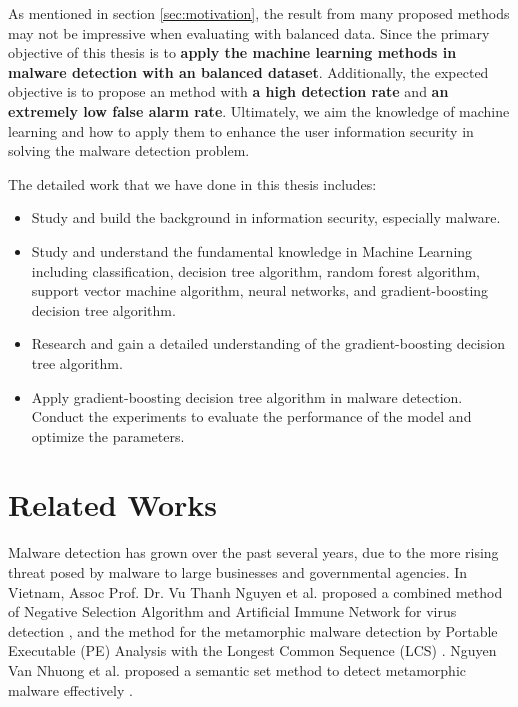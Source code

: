 As mentioned in section \ref{sec:motivation}, the result from many proposed methods may not be impressive when evaluating with balanced data. 
Since the primary objective of this thesis is to \textbf{apply the machine learning methods in malware detection with an balanced dataset}. 
Additionally, the expected objective is to propose an method with \textbf{a high detection rate} and \textbf{an extremely low false alarm rate}. 
Ultimately, we aim the knowledge of machine learning and how to apply them to enhance the user information security in solving the malware detection problem. 

The detailed work that  we have done in this thesis includes:
\begin{itemize}
    \item Study and build the background in information security, especially malware.
    \item Study and understand the fundamental knowledge in Machine  Learning including classification, decision tree algorithm, random forest algorithm, support vector machine algorithm, neural networks, and gradient-boosting decision tree algorithm. 
    \item Research and gain a detailed understanding of the gradient-boosting decision tree algorithm.
    \item Apply gradient-boosting decision tree algorithm in malware detection. Conduct the experiments to evaluate the performance of the model and optimize the parameters.
\end{itemize}

\section{Related Works}

Malware detection has grown over the past several years, due to the more rising threat posed by malware to large businesses and governmental agencies. 
In Vietnam, Assoc Prof. Dr. Vu Thanh Nguyen et al. proposed a combined method of Negative Selection Algorithm and Artificial Immune Network for virus detection \cite{nguyen2014combination}, and the method for the metamorphic malware detection by Portable Executable (PE) Analysis with the Longest Common Sequence (LCS) \cite{vu2017metamorphic}.
Nguyen Van Nhuong et al. proposed a semantic set method to detect metamorphic malware effectively \cite{van2014semantic}.

